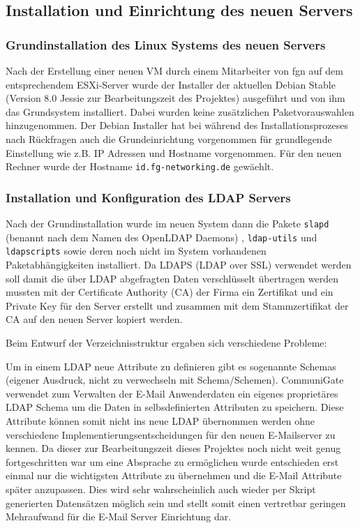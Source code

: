 \documentclass[11pt,a4paper,titlepage=firstiscover]{scrartcl} %
\begin{document}
\subsection{Installation und Einrichtung des neuen Servers}
\subsubsection{Grundinstallation des Linux Systems des neuen Servers}
Nach der Erstellung einer neuen VM durch einem Mitarbeiter von fgn auf dem entsprechendem ESXi-Server wurde der Installer der aktuellen Debian Stable (Version 8.0 Jessie zur Bearbeitungszeit des Projektes) ausgef\"uhrt und von ihm das Grundsystem installiert. Dabei wurden keine zus\"atzlichen Paketvorauswahlen hinzugenommen.  Der Debian Installer hat bei w\"ahrend des Installationsprozeses nach R\"uckfragen auch die Grundeinrichtung vorgenommen f\"ur grundlegende Einstellung wie z.B. IP Adressen und Hostname vorgenommen. F\"ur den neuen Rechner wurde der Hostname \texttt{id.fg-networking.de} gew\"aehlt.

\subsubsection{Installation und Konfiguration des LDAP Servers}
Nach der Grundinstallation wurde im neuen System dann die Pakete \texttt{slapd} (benannt nach dem Namen des OpenLDAP Daemons) , \texttt{ldap-utils} und \texttt{ldapscripts} sowie deren noch nicht im System vorhandenen Paketabh\"angigkeiten installiert. Da LDAPS (LDAP over SSL) verwendet werden soll damit die \"uber LDAP abgefragten Daten verschl\"usselt \"ubertragen werden mussten mit der Certificate Authority (CA) der Firma ein Zertifikat und ein Private Key f\"ur den Server erstellt und zusammen mit dem Stammzertifikat der CA auf den neuen Server kopiert werden.\newline

Beim Entwurf der Verzeichnisstruktur ergaben sich verschiedene Probleme:

\noindent Um in einem LDAP neue Attribute zu definieren gibt es sogenannte Schemas (eigener Ausdruck, nicht zu verwechseln mit Schema/Schemen). CommuniGate verwendet zum Verwalten der E-Mail Anwenderdaten ein eigenes propriet\"ares LDAP Schema um die Daten in selbsdefinierten Attributen zu speichern. Diese Attribute k\"onnen somit nicht ins neue LDAP \"ubernommen werden ohne verschiedene Implementierungsentscheidungen f\"ur den neuen E-Mailserver zu kennen. Da dieser zur Bearbeitungszeit dieses Projektes noch nicht weit genug fortgeschritten war um eine Absprache zu erm\"oglichen wurde entschieden erst einmal nur die wichtigsten Attribute zu \"ubernehmen und die E-Mail Attribute sp\"ater anzupassen. Dies wird sehr wahrscheinlich auch wieder per Skript generierten Datens\"atzen m\"oglich sein und stellt somit einen vertretbar geringen Mehraufwand f\"ur die E-Mail Server Einrichtung dar.
\end{document}
